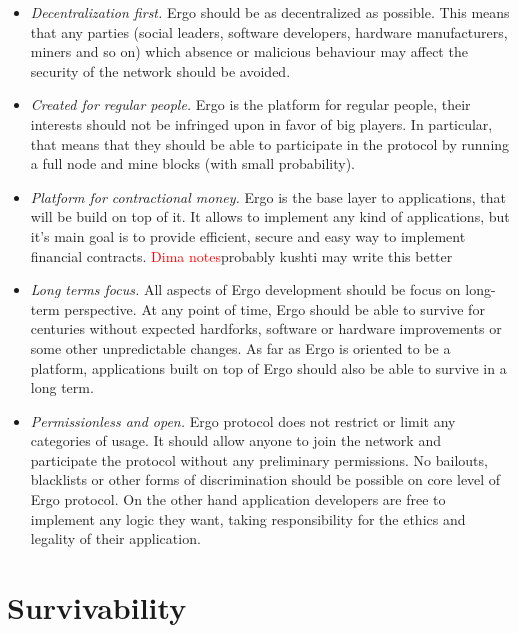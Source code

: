 \documentclass[]{article}
\newcommand{\dnote}[1]{{\textcolor{red}{Dima notes}}{#1}}
\begin{document}
    \begin{itemize}
        \item{\em Decentralization first.} Ergo should be as decentralized as possible.
        This means that any parties (social leaders, software developers, hardware manufacturers, miners and so on)
        which absence or malicious behaviour may affect the security of the network should be avoided.
        \item{\em Created for regular people.} Ergo is the platform for regular people, their interests should
        not be infringed upon in favor of big players. In particular, that means that they should be able to
        participate in the protocol by running a full node and mine blocks (with small probability).
        \item{\em Platform for contractional money.} Ergo is the base layer to applications, that will be
        build on top of it. It allows to implement any kind of applications, but it's main goal is
        to provide efficient, secure and easy way to implement financial contracts. \dnote{probably kushti may write this better}
        \item{\em Long terms focus.} All aspects of Ergo development should be focus on long-term perspective.
        At any point of time, Ergo should be able to survive for centuries without expected hardforks,
        software or hardware improvements or some other unpredictable changes. As far as Ergo is oriented
        to be a platform, applications built on top of Ergo should also be able to survive in a long term.
        \item{\em Permissionless and open.} Ergo protocol does not restrict or limit any categories of usage.
        It should allow anyone to join the network and participate the protocol without any preliminary permissions.
        No bailouts, blacklists or other forms of discrimination should be possible on core level of Ergo protocol.
        On the other hand application developers are free to implement any logic they want, taking responsibility
        for the ethics and legality of their application.
    \end{itemize}


    \section{Survivability}

\end{document}
